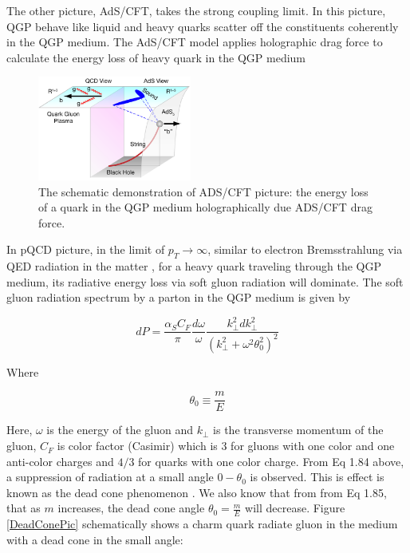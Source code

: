 The other picture, AdS/CFT, takes the strong coupling limit. In this picture, QGP behave like liquid and heavy quarks scatter off the constituents coherently in the QGP medium. The AdS/CFT model applies holographic drag force \cite{ADSCFTDrag} to calculate the energy loss of heavy quark \cite{HQHoloELoss} in the QGP medium

 \begin{figure}[hbtp]
\begin{center}
\includegraphics[width=0.45\textwidth]{Figures/Chapter1/ADSCFT.png}
\caption{The schematic demonstration of ADS/CFT picture: the energy loss of a quark in the QGP medium holographically due ADS/CFT drag force.}
\label{ADCCFT}
\end{center}
\end{figure}  

In pQCD picture, in the limit of $p_T \rightarrow \infty$, similar to electron Bremsstrahlung via QED radiation in the matter \cite{Brems}, for a heavy quark traveling through the QGP medium, its radiative energy loss via soft gluon radiation will dominate. The soft gluon radiation spectrum by a parton in the QGP medium is given by \cite{DEADCONE}

\begin{equation}
dP = \frac{\alpha_S C_{F}}{\pi} \frac{d\omega}{\omega}\frac{k_{\perp}^2 dk_{\perp}^2}{(k_{\perp}^2  + \omega^2\theta_0^2)^2}
\end{equation}

Where 

\begin{equation}
\theta_0 \equiv \frac{m}{E}
\end{equation}

Here, $\omega$ is the energy of the gluon and $k_{\perp}$ is the transverse momentum of the gluon, $C_F$ is color factor (Casimir) which is $3$ for gluons with one color and one anti-color charges and $4/3$ for quarks with one color charge. From Eq 1.84 above, a suppression of radiation at a small angle $0 - \theta_0$ is observed. This is effect is known as the dead cone phenomenon \cite{DEADCONE}. We also know that from from Eq 1.85, that as $m$ increases, the dead cone angle $\theta_0 = \frac{m}{E}$ will decrease. Figure \ref{DeadConePic} schematically shows a charm quark radiate gluon in the medium with a dead cone in the small angle:

